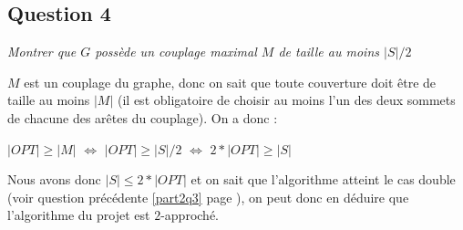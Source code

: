   \subsection{Question 4}
  \emph{Montrer que $G$ possède un couplage maximal $M$ de taille au moins
  $|S|/2$}
  
  $M$ est un couplage du graphe, donc on sait que toute couverture doit
  être de taille au moins $|M|$ (il est obligatoire de choisir au moins
  l'un des deux sommets de chacune des arêtes du couplage). On a donc :
  \begin{center}
   $|OPT| \geq |M|$ $\iff$ $|OPT| \geq |S|/2$ $\iff$ $2 * |OPT| \geq
   |S|$
  \end{center}

  Nous avons donc $|S| \leq 2 * |OPT|$ et on sait que l'algorithme
  atteint le cas double (voir question précédente \ref{part2q3} page
  \pageref{part2q3}), on peut donc en déduire que l'algorithme du projet
  est $2$-approché.
  